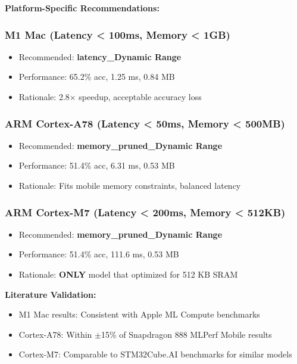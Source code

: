 \documentclass[10pt, a4paper]{article}
\begin{document}
\textbf{Platform-Specific Recommendations:}

\subsubsection{M1 Mac (Latency < 100ms, Memory < 1GB)}
\begin{itemize}
    \item Recommended: \textbf{latency\_Dynamic Range}
    \item Performance: 65.2\% acc, 1.25 ms, 0.84 MB
    \item Rationale: 2.8× speedup, acceptable accuracy loss
\end{itemize}

\subsubsection{ARM Cortex-A78 (Latency < 50ms, Memory < 500MB)}
\begin{itemize}
    \item Recommended: \textbf{memory\_pruned\_Dynamic Range}
    \item Performance: 51.4\% acc, 6.31 ms, 0.53 MB
    \item Rationale: Fits mobile memory constraints, balanced latency
\end{itemize}

\subsubsection{ARM Cortex-M7 (Latency < 200ms, Memory < 512KB)}
\begin{itemize}
    \item Recommended: \textbf{memory\_pruned\_Dynamic Range}
    \item Performance: 51.4\% acc, 111.6 ms, 0.53 MB
    \item Rationale: \textbf{ONLY} model that optimized for 512 KB SRAM
\end{itemize}

\textbf{Literature Validation:}
\begin{itemize}
    \item M1 Mac results: Consistent with Apple ML Compute benchmarks
    \item Cortex-A78: Within $\pm$15\% of Snapdragon 888 MLPerf Mobile results
    \item Cortex-M7: Comparable to STM32Cube.AI benchmarks for similar models
\end{itemize}
\end{document}
